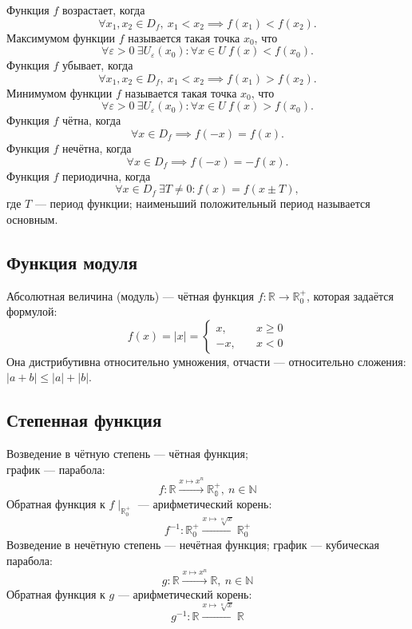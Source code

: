 Функция $f$ {\ital возрастает}, когда
$$\forall x_1,x_2\in D_f,\ x_1\less x_2\implies f(x_1)\less f(x_2).$$
{\ital Максимумом} функции $f$ называется такая точка $x_0$, что
$$\forall\varepsilon\greater 0\ \exists U_\varepsilon(x_0)\colon\forall x\in U\ f(x)
\less f(x_0).$$
Функция $f$ {\ital убывает}, когда
$$\forall x_1,x_2\in D_f,\ x_1\less x_2\implies f(x_1)\greater f(x_2).$$
{\ital Минимумом} функции $f$ называется такая точка $x_0$, что
$$\forall\varepsilon\greater 0\ \exists U_\varepsilon(x_0)\colon\forall x\in U\ f(x)
\greater f(x_0).$$
Функция $f$ {\ital чётна}, когда
$$\forall x\in D_f\implies f(-x)=f(x).$$
Функция $f$ {\ital нечётна}, когда
$$\forall x\in D_f\implies f(-x)=-f(x).$$
Функция $f$ {\ital периодична}, когда
$$\forall x\in D_f\ \exists T\neq 0\colon f(x)=f(x\pm T),$$
где $T$ --- {\bold период} функции; наименьший положительный период называется
{\ital основным}.

\subsection{Функция модуля}

{\bold Абсолютная величина} {\ital (модуль)} --- чётная функция $f\colon\mathbb{R}
\to\mathbb{R}^+_0$, которая задаётся формулой:
$$f(x)=|x|=\begin{cases}x,\quad &x\geq 0\\-x,\quad &x\less 0\end{cases}$$
Она {\ital дистрибутивна} относительно умножения, отчасти --- относительно
сложения: $|a+b|\leq |a|+|b|$.

\subsection{Степенная функция}

{\bold Возведение в чётную степень} --- чётная функция;\\
график --- {\ital парабола}:\\[-10pt]
$$f\colon\mathbb{R}\xrightarrow{x\mapsto x^n}\mathbb{R^+_0},\ n\in\mathbb{N}$$
Обратная функция к $f\mid_{\mathbb{R}^+_0}$ --- {\bold арифметический корень}:\\[-3pt]
$$f^{-1}\colon\mathbb{R}^+_0\xrightarrow{x\mapsto\sqrt[n]{x}}\mathbb{R}^+_0$$
{\bold Возведение в нечётную степень} --- нечётная функция; график --- {\ital кубическая 
парабола}:
$$g\colon\mathbb{R}\xrightarrow{x\mapsto x^n}\mathbb{R},\ n\in\mathbb{N}$$
Обратная функция к $g$ --- {\bold арифметический корень}:
$$g^{-1}\colon\mathbb{R}\xrightarrow{x\mapsto\sqrt[n]{x}}\mathbb{R}$$

